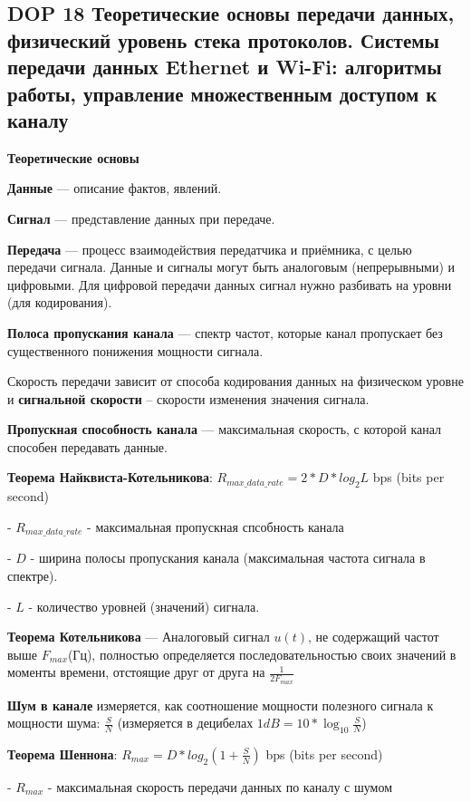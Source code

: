 \subsection{DOP 18 Теоретические основы передачи данных, физический уровень стека протоколов. Системы передачи данных Ethernet и Wi-Fi: алгоритмы работы, управление множественным доступом к каналу}

\textbf{Теоретические основы}


\textbf{Данные} --- описание фактов, явлений.

\textbf{Сигнал} --- представление данных при передаче.

\textbf{Передача} --- процесс взаимодействия передатчика и приёмника, с целью передачи сигнала.
Данные и сигналы могут быть аналоговым (непрерывными) и цифровыми.
Для цифровой передачи данных сигнал нужно разбивать на уровни (для кодирования).

\textbf{Полоса пропускания канала} --- спектр частот, которые канал пропускает без существенного понижения мощности сигнала.

Скорость передачи зависит от способа кодирования данных на физическом уровне и \textbf{сигнальной скорости} -- скорости изменения значения сигнала.

\textbf{Пропускная способность канала} --- максимальная скорость, с которой канал способен передавать данные.

\bigbreak
\textbf{Теорема Найквиста-Котельникова}: $R_{max\_data\_rate} = 2*D*log_2{L}$ bps (bits per second)

- $R_{max\_data\_rate}$ - максимальная пропускная спсобность канала

- $D$ - ширина полосы пропускания канала (максимальная частота сигнала в спектре).

- $L$ - количество уровней (значений) сигнала.

\bigbreak
\textbf{Теорема Котельникова} --- Аналоговый сигнал $u(t)$, не содержащий частот выше $F_{max}$(Гц), полностью определяется последовательностью своих значений в моменты времени, отстоящие друг от друга на $\frac{1}{2F_{max}}$

\bigbreak
\textbf{Шум в канале} измеряется, как соотношение мощности полезного сигнала к мощности шума: $\frac{S}{N}$ (измеряется в децибелах $1dB = 10*\log_{10}{\frac{S}{N}}$)

\bigbreak
\textbf{Теорема Шеннона}: $R_{max} = D*log_2{(1+\frac{S}{N})}$ bps (bits per second)

- $R_{max}$ - максимальная скорость передачи данных по каналу с шумом

